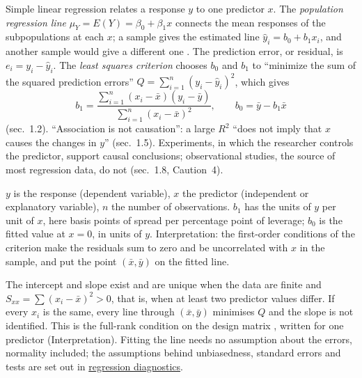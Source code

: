 \begin{qfmethod}\label{meth:simple-regression-estimation}
 Simple linear regression relates a response $y$ to one predictor $x$. The \emph{population regression line} $\mu_Y=E(Y)=\beta_0+\beta_1x$ connects the mean responses of the subpopulations at each $x$; a sample gives the estimated line $\hat y_i=b_0+b_1x_i$, and another sample would give a different one \citep[sec.~1.3]{regression-methods-course-notes}. The prediction error, or residual, is $e_i=y_i-\hat y_i$. The \emph{least squares criterion} chooses $b_0$ and $b_1$ to ``minimize the sum of the squared prediction errors'' $Q=\sum_{i=1}^n(y_i-\hat y_i)^2$, which gives
\[ b_1=\frac{\sum_{i=1}^n(x_i-\bar x)(y_i-\bar y)}{\sum_{i=1}^n(x_i-\bar x)^2},\qquad b_0=\bar y-b_1\bar x \]
(sec.~1.2). ``Association is not causation'': a large $R^2$ ``does not imply that $x$ causes the changes in $y$'' (sec.~1.5). Experiments, in which the researcher controls the predictor, support causal conclusions; observational studies, the source of most regression data, do not (sec.~1.8, Caution~4).

 $y$ is the response (dependent variable), $x$ the predictor (independent or explanatory variable), $n$ the number of observations. $b_1$ has the units of $y$ per unit of $x$, here basis points of spread per percentage point of leverage; $b_0$ is the fitted value at $x=0$, in units of $y$. Interpretation: the first-order conditions of the criterion make the residuals sum to zero and be uncorrelated with $x$ in the sample, and put the point $(\bar x,\bar y)$ on the fitted line.

 The intercept and slope exist and are unique when the data are finite and $S_{xx}=\sum(x_i-\bar x)^2>0$, that is, when at least two predictor values differ. If every $x_i$ is the same, every line through $(\bar x,\bar y)$ minimises $Q$ and the slope is not identified. This is the full-rank condition on the design matrix \citep[Normal linear regression model, ``Setting'' and ``Assumptions'']{linear-regression-lectures}, written for one predictor (Interpretation). Fitting the line needs no assumption about the errors, normality included; the assumptions behind unbiasedness, standard errors and tests are set out in \hyperref[meth:regression-diagnostics-anova]{regression diagnostics}.


\end{qfmethod}
